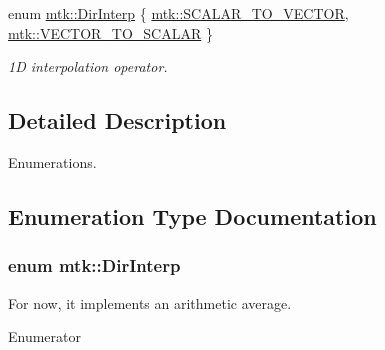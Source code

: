 \begin{DoxyCompactItemize}
enum \hyperlink{group__c02-enums_ga674ec67bd1baa04e5dc06c2bcc351972}{mtk\+::\+Dir\+Interp} \{ \hyperlink{group__c02-enums_ga674ec67bd1baa04e5dc06c2bcc351972abc9e2b8cd5a497c9f3252a792e356139}{mtk\+::\+S\+C\+A\+L\+A\+R\+\_\+\+T\+O\+\_\+\+V\+E\+C\+T\+O\+R}, 
\hyperlink{group__c02-enums_ga674ec67bd1baa04e5dc06c2bcc351972a122cf2e24aef105e9214698206af6904}{mtk\+::\+V\+E\+C\+T\+O\+R\+\_\+\+T\+O\+\_\+\+S\+C\+A\+L\+A\+R}
 \}
\begin{DoxyCompactList}\small\item\em 1\+D interpolation operator. \end{DoxyCompactList}\end{DoxyCompactItemize}


\subsection{Detailed Description}
Enumerations. 

\subsection{Enumeration Type Documentation}
\hypertarget{group__c02-enums_ga674ec67bd1baa04e5dc06c2bcc351972}{
\subsubsection[{Dir\+Interp}]{\setlength{\rightskip}{0pt plus 5cm}enum {\bf mtk\+::\+Dir\+Interp}}}\label{group__c02-enums_ga674ec67bd1baa04e5dc06c2bcc351972}
For now, it implements an arithmetic average. \begin{Desc}
\item[Enumerator]\par
\begin{description}
\item[{\em 
\hypertarget{group__c02-enums_ga674ec67bd1baa04e5dc06c2bcc351972abc9e2b8cd5a497c9f3252a792e356139}{S\+C\+A\+L\+A\+R\+\_\+\+T\+O\+\_\+\+V\+E\+C\+T\+O\+R}\label{group__c02-enums_ga674ec67bd1baa04e5dc06c2bcc351972abc9e2b8cd5a497c9f3252a792e356139}
}]\item[{\em 
\hypertarget{group__c02-enums_ga674ec67bd1baa04e5dc06c2bcc351972a122cf2e24aef105e9214698206af6904}{V\+E\+C\+T\+O\+R\+\_\+\+T\+O\+\_\+\+S\+C\+A\+L\+A\+R}\label{group__c02-enums_ga674ec67bd1baa04e5dc06c2bcc351972a122cf2e24aef105e9214698206af6904}
}]\end{description}
\end{Desc}


